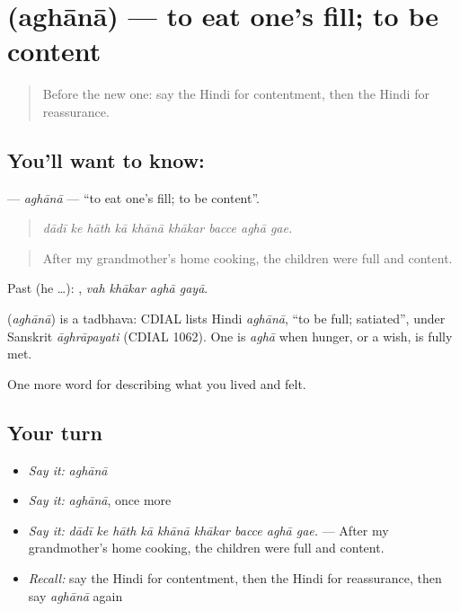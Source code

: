 \section[\texorpdfstring{\hi{अघाना} (aghānā)}{अघाना (aghānā)}]{ (aghānā) — to eat one's fill; to be content}

\label{lesson:HI-C463-aghana}



\begin{quote}
Before the new one: say the Hindi for contentment, then the Hindi for reassurance.
\end{quote}

\subsection*{You'll want to know: }
\textbf{} — \emph{aghānā} — \textquotedblleft{}to eat one's fill; to be content\textquotedblright{}.

\begin{quote}
        
\end{quote}

\begin{quote}
\emph{dādī ke hāth kā khānā khākar bacce aghā gae.}
\end{quote}

\begin{quote}
After my grandmother's home cooking, the children were full and content.
\end{quote}

Past (he …):    , \emph{vah khākar aghā gayā}.

\begin{cousinweb}
\textbf{} (\emph{aghānā}) is a tadbhava: CDIAL lists Hindi \emph{aghānā}, \textquotedblleft{}to be full; satiated\textquotedblright{}, under Sanskrit \emph{āghrāpayati} (CDIAL 1062). One is \emph{aghā} when hunger, or a wish, is fully met.
\end{cousinweb}

\begin{grammarlens}[title={What you've built}]
One more word for describing what you lived and felt.
\end{grammarlens}

\subsection*{Your turn}
\begin{itemize}
\raggedright
  \item \emph{Say it:} \emph{aghānā}
  \item \emph{Say it:} \emph{aghānā}, once more
  \item \emph{Say it:} \emph{dādī ke hāth kā khānā khākar bacce aghā gae.} — After my grandmother's home cooking, the children were full and content.
  \item \emph{Recall:} say the Hindi for contentment, then the Hindi for reassurance, then say \emph{aghānā} again
\end{itemize}

